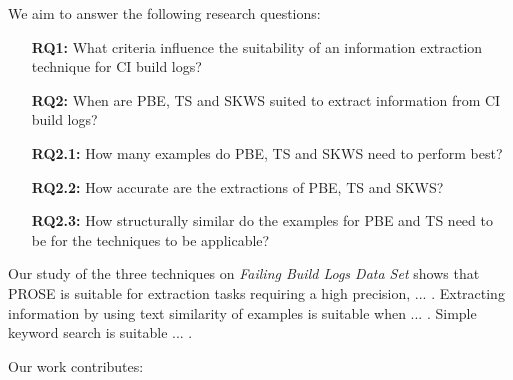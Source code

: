 \documentclass[\myrootdir/main.tex]{subfiles}
\begin{document}
We aim to answer the following research questions:

\begin{itemize}
  \item[\textbf{RQ1:}] What criteria influence the suitability of an information extraction technique for CI build logs?
  \item[\textbf{RQ2:}] When are PBE, TS and SKWS suited to extract information from CI build logs?
  \item[\textbf{RQ2.1:}] How many examples do PBE, TS and SKWS need to perform best?
  \item[\textbf{RQ2.2:}] How accurate are the extractions of PBE, TS and SKWS?
  \item[\textbf{RQ2.3:}] How structurally similar do the examples for PBE and TS need to be for the techniques to be applicable?
\end{itemize}

Our study of the three techniques on \emph{Failing Build Logs Data Set} shows that PROSE is suitable for extraction tasks requiring a high precision, ... . Extracting information by using text similarity of examples is suitable when ... . Simple keyword search is suitable ... .


Our work contributes:
\end{document}
